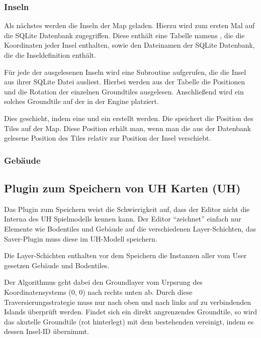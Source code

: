 \subsubsection{Inseln}
Als nächstes werden die Inseln der Map geladen. Hierzu wird zum ersten
Mal auf die SQLite Datenbank zugegriffen. Diese enthält eine Tabelle
namens , die die Koordinaten jeder Insel enthalten, sowie
den Dateinamen der SQLite Datenbank, die die Inseldefinition enthält.

Für jede der ausgelesenen Inseln wird eine Subroutine aufgerufen, die
die Insel aus ihrer SQLite Datei ausliest. Hierbei werden aus der
 Tabelle die Positionen und die Rotation der einzelnen
Groundtiles ausgelesen. Anschließend wird ein solches Groundtile
auf der  in der Engine platziert.

Dies geschieht, indem eine  und ein 
erstellt werden. Die  speichert die Position des Tiles
auf der Map. Diese Position erhält man, wenn man die aus der Datenbank
gelesene Position des Tiles relativ zur Position der Insel verschiebt.

\subsubsection{Gebäude}


\subsection{Plugin zum Speichern von UH Karten (UH)}
Das Plugin zum Speichern weist die Schwierigkeit auf, dass der Editor nicht die
Interna des UH Spielmodells kennen kann. Der Editor ``zeichnet'' einfach nur
Elemente wie Bodentiles und Gebäude auf die verschiedenen Layer-Schichten, das
Saver-Plugin muss diese im UH-Modell speichern.

Die Layer-Schichten enthalten vor dem Speichern die Instanzen aller vom User
gesetzen Gebäude und Bodentiles.

Der Algorithmus geht dabei den Groundlayer vom Urpsrung des Koordinatensystems
(0, 0) nach rechts unten ab. Durch diese Traversierungsstrategie muss nur
nach oben und nach links auf zu verbindenden Islands überprüft werden. Findet
sich ein direkt angrenzendes Groundtile, so wird das akutelle Groundtile (rot
hinterlegt) mit dem bestehenden vereinigt, indem es dessen Insel-ID übernimmt.

